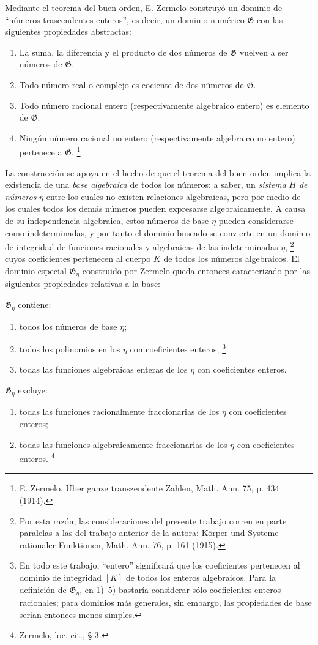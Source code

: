 \documentclass[11pt]{article}
\begin{document}
Mediante el teorema del buen orden, E. Zermelo construyó un dominio de ``números trascendentes enteros'', es decir, un dominio numérico $\mathfrak G$ con las siguientes propiedades abstractas:
\begin{enumerate}
\item[I.] La suma, la diferencia y el producto de dos números de $\mathfrak G$ vuelven a ser números de $\mathfrak G$.
\item[II.] Todo número real o complejo es cociente de dos números de $\mathfrak G$.
\item[III.] Todo número racional entero (respectivamente algebraico entero) es elemento de $\mathfrak G$.
\item[IV.] Ningún número racional no entero (respectivamente algebraico no entero) pertenece a $\mathfrak G$.
\footnote{E. Zermelo, Über ganze transzendente Zahlen, Math. Ann. 75, p. 434 (1914).}
\end{enumerate}

La construcción se apoya en el hecho de que el teorema del buen orden implica la existencia de una \emph{base algebraica} de todos los números: a saber, un \emph{sistema} $H$ \emph{de números} $\eta$ entre los cuales no existen relaciones algebraicas, pero por medio de los cuales todos los demás números pueden expresarse algebraicamente. A causa de su independencia algebraica, estos números de base $\eta$ pueden considerarse como indeterminadas, y por tanto el dominio buscado se convierte en un dominio de integridad de funciones racionales y algebraicas de las indeterminadas $\eta$,
\footnote{Por esta razón, las consideraciones del presente trabajo corren en parte paralelas a las del trabajo anterior de la autora: Körper und Systeme rationaler Funktionen, Math. Ann. 76, p. 161 (1915).}
cuyos coeficientes pertenecen al cuerpo $K$ de todos los números algebraicos. El dominio especial $\mathfrak G_\eta$ construido por Zermelo queda entonces caracterizado por las siguientes propiedades relativas a la base:

$\mathfrak G_\eta$ contiene:
\begin{enumerate}
\item[1)] todos los números de base $\eta$;
\item[2)] todos los polinomios en los $\eta$ con coeficientes enteros;
\footnote{En todo este trabajo, ``entero'' significará que los coeficientes pertenecen al dominio de integridad $[K]$ de todos los enteros algebraicos. Para la definición de $\mathfrak G_\eta$, en 1)--5) bastaría considerar sólo coeficientes enteros racionales; para dominios más generales, sin embargo, las propiedades de base serían entonces menos simples.}
\item[3)] todas las funciones algebraicas enteras de los $\eta$ con coeficientes enteros.
\end{enumerate}
$\mathfrak G_\eta$ excluye:
\begin{enumerate}
\item[4)] todas las funciones racionalmente fraccionarias de los $\eta$ con coeficientes enteros;
\item[5)] todas las funciones algebraicamente fraccionarias de los $\eta$ con coeficientes enteros.
\footnote{Zermelo, loc. cit., § 3.}
\end{enumerate}
\end{document}
